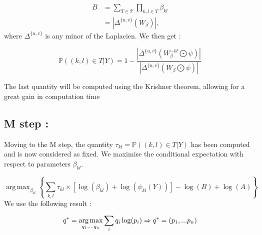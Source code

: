 \documentclass[a4paper,10pt]{article}
\DeclareMathOperator*{\argmax}{arg\,max}
\begin{document}
\begin{align*}
B &= \sum_{T \in \mathcal{T}} \prod_{k,l\in T} \beta_{kl}\\
 &=|\Delta^{\{u,v\}}(W_{\beta})|,
\end{align*}
where $\Delta^{\{u,v\}}$ is any minor of the Laplacien. We then get :

\[ \mathds{P}((k,l)\in T | Y) =1-\frac{|\Delta^{\{u,v\}}(W_{\beta}^{-kl}\bigodot\psi)|}{|\Delta^{\{u,v\}}(W_{\beta}\bigodot\psi)|}\]

The last quantity will be computed using the Krishner theorem, allowing for a great gain in computation time


\subsection{M step :\\}
Moving to the M step, the quantity $\tau_{kl} = \mathds{P}((k,l)\in T | Y)$ has been computed and is now considered as fixed.
We maximise the conditional expectation with respect to parameters $\beta_{kl}$.

\[\argmax_{\beta_{kl}} \left\{\sum_{k,l} \tau_{kl}\times \left[ \log(\beta_{kl}) + \log(\psi_{kl}(Y)) \right]
 -\log(B)+\log(A)\right\}\]
We use the following result :

\begin{equation}
 \label{res}
q^ * =  \argmax_{q_1,...q_n}  \sum_i q_i \log(p_i) \Rightarrow q^ * = (p_1,...p_n) \\
\end{equation}
\end{document}
